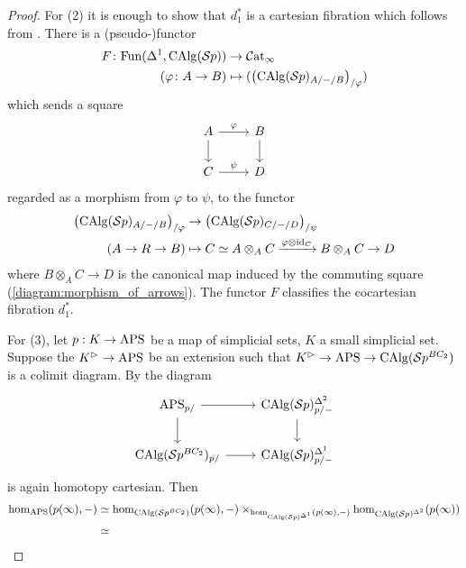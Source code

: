 \begin{proof}
    For (2) it is enough to show that $d_1^*$ is a cartesian fibration which follows from \cite[Corollary 2.4.6.5]{HTT}.  
    There is a (pseudo-)functor
    \begin{align*}
        F \colon \mathrm{Fun}(\Delta^1, \operatorname{CAlg}(\mathcal{S}p)) &\to \mathcal{C}\mathrm{at}_\infty \\
        (\varphi \colon A \to B) &\mapsto (\left(\operatorname{CAlg}(\mathcal{S}p)_{A/-/B}\right)_{/\varphi}) 
    \end{align*}
    which sends a square
    \begin{equation}\label{diagram:morphism_of_arrows}
    \begin{tikzcd}
        A \ar[r,"\varphi"] \ar[d] & B \ar[d] \\
        C \ar[r,"\psi"] & D 
    \end{tikzcd}
    \end{equation}
    regarded as a morphism from $ \varphi $ to $ \psi $, to the functor
    \begin{equation}
    \begin{split}
        \left(\operatorname{CAlg}(\mathcal{S}p)_{A/-/B}\right)_{/\varphi} &\to \left(\operatorname{CAlg}(\mathcal{S}p)_{C/-/D}\right)_{/\psi} \\
        (A \to R \to B) & \mapsto C \simeq A \otimes_A C \xrightarrow{\varphi \otimes \mathrm{id}_C} B \otimes_A C \to D
    \end{split}
    \end{equation}
    where $ B \otimes_A C \to D $ is the canonical map induced by the commuting square (\ref{diagram:morphism_of_arrows}). 
    The functor $ F $ classifies the cocartesian fibration $ d_1^* $. 

    For (3), let $p:K\to \mathrm{APS}$ be a map of simplicial sets, $K$ a small simplicial set. Suppose the $K^\vartriangleright\to \mathrm{APS}$ be an extension such that $K^\vartriangleright\to \mathrm{APS}\to \operatorname{CAlg}(\mathcal{S}p^{BC_2})$ is a colimit diagram. By \cite[Proposition 2.4.3.2]{HTT} the diagram \[\begin{tikzcd}
        \aps_{p/}\arrow[r]\arrow[d] &\calg(\Sp)^{\Delta^2}_{p/-}\arrow[d]\\
        \calg(\Sp^{BC_2})_{p/}\arrow[r] & \calg(\Sp)^{\Delta^1}_{p/-}
    \end{tikzcd}\] is again homotopy cartesian. Then 
    \begin{align*}
        \hom_{\mathrm{APS}}(p(\infty), -)&\simeq \hom_{\operatorname{CAlg}(\mathcal{S}p^{BC_2})}(p(\infty), -)\times_{\hom_{\operatorname{CAlg}(\mathcal{S}p)^{\Delta^1}}(p(\infty),-)}\hom_{\operatorname{CAlg}(\mathcal{S}p)^{\Delta^2}}(p(\infty))\\
        &\simeq 
    \end{align*}
\end{proof}

